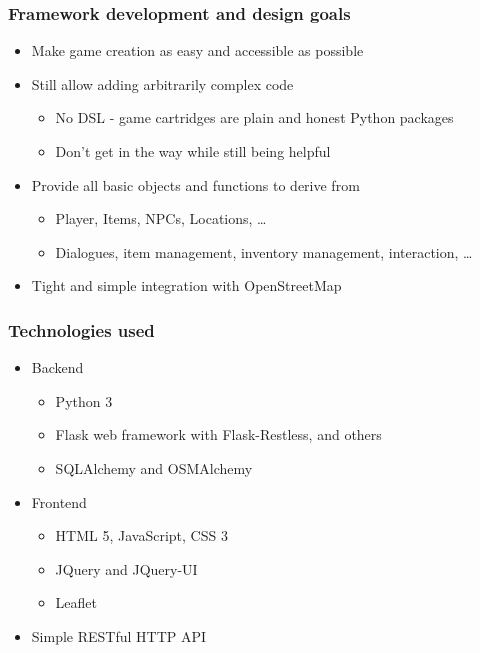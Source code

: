 \documentclass[aspectratio=43]{beamer}
\begin{document}
 \begin{frame}
  \frametitle{Framework development and design goals}

  \begin{itemize}
   \item{Make game creation as easy and accessible as possible}
   \item{Still allow adding arbitrarily complex code
    \begin{itemize}
     \item{No DSL - game cartridges are plain and honest Python packages}
     \item{Don't get in the way while still being helpful}
    \end{itemize}
   }
   \item{Provide all basic objects and functions to derive from
    \begin{itemize}
     \item{Player, Items, NPCs, Locations, …}
     \item{Dialogues, item management, inventory management, interaction, …}
    \end{itemize}
   }
   \item{Tight and simple integration with OpenStreetMap}
  \end{itemize}
 \end{frame}


 \begin{frame}
  \frametitle{Technologies used}

  \begin{itemize}
   \item{Backend
    \begin{itemize}
     \item{Python 3}
     \item{Flask web framework with Flask-Restless, and others}
     \item{SQLAlchemy and OSMAlchemy}
    \end{itemize}
   }
   \item{Frontend
    \begin{itemize}
     \item{HTML 5, JavaScript, CSS 3}
     \item{JQuery and JQuery-UI}
     \item{Leaflet}
    \end{itemize}
   }
   \item{Simple RESTful HTTP API}
  \end{itemize}
 \end{frame}
\end{document}
